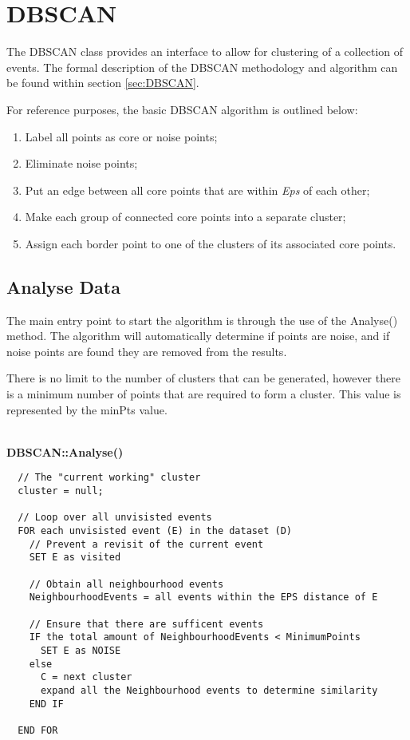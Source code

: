 \section{DBSCAN}

The DBSCAN class provides an interface to allow for clustering of a collection 
of events. The formal description of the DBSCAN methodology and algorithm can 
be found within section \ref{sec:DBSCAN}.

For reference purposes, the basic DBSCAN algorithm is outlined below:
\begin{enumerate}
  \item Label all points as core or noise points;
  \item Eliminate noise points;
  \item Put an edge between all core points that are within {\em Eps} of each 
        other;
  \item Make each group of connected core points into a separate cluster;
  \item Assign each border point to one of the clusters of its associated core 
        points.
\end{enumerate}


\subsection{Analyse Data}
The main entry point to start the algorithm is through the use of the 
{\ttfamily Analyse()} method. The algorithm will automatically determine if 
points are noise, and if noise points are found they are removed from the 
results.

There is no limit to the number of clusters that can be generated, however 
there is a minimum number of points that are required to form a cluster. This 
value is represented by the minPts value.

~\\
{\bfseries DBSCAN::Analyse()}
\lstset{style=pseudocode}
\begin{lstlisting}
  // The "current working" cluster
  cluster = null;

  // Loop over all unvisisted events
  FOR each unvisisted event (E) in the dataset (D)
    // Prevent a revisit of the current event
    SET E as visited

    // Obtain all neighbourhood events 
    NeighbourhoodEvents = all events within the EPS distance of E

    // Ensure that there are sufficent events
    IF the total amount of NeighbourhoodEvents < MinimumPoints
      SET E as NOISE
    else
      C = next cluster
      expand all the Neighbourhood events to determine similarity
    END IF

  END FOR
\end{lstlisting}



